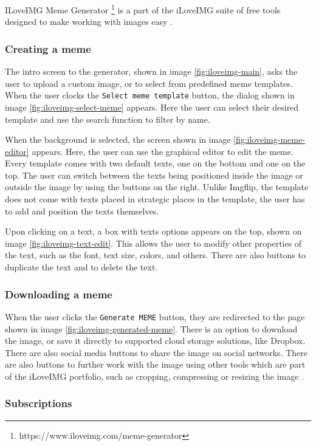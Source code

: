ILoveIMG Meme Generator \footnote{https://www.iloveimg.com/meme-generator} is a part of the iLoveIMG suite of free tools designed to make working with images easy \cite{iloveimg-features}.

\subsubsection{Creating a meme}

The intro screen to the generator, shown in image \ref{fig:iloveimg-main}, asks the user to upload a custom image, or to select from predefined meme templates. When the user clocks the \texttt{Select meme template} button, the dialog shown in image \ref{fig:iloveimg-select-meme} appears. Here the user can select their desired template and use the search function to filter by name.

When the background is selected, the screen shown in image \ref{fig:iloveimg-meme-editor} appears. Here, the user can use the graphical editor to edit the meme. Every template comes with two default texts, one on the bottom and one on the top. The user can switch between the texts being positioned inside the image or outside the image by using the buttons on the right. Unlike Imgflip, the template does not come with texts placed in strategic places in the template, the user has to add and position the texts themselves.

Upon clicking on a text, a box with texts options appears on the top, shown on image \ref{fig:iloveimg-text-edit}. This allows the user to modify other properties of the text, such as the font, text size, colors, and others. There are also buttons to duplicate the text and to delete the text.

\subsubsection{Downloading a meme}

When the user clicks the \texttt{Generate MEME} button, they are redirected to the page shown in image \ref{fig:iloveimg-generated-meme}. There is an option to download the image, or save it directly to supported cloud storage solutions, like Dropbox. There are also social media buttons to share the image on social networks. There are also buttons to further work with the image using other tools which are part of the iLoveIMG portfolio, such as cropping, compressing or resizing the image \cite{iloveimg-features}.

\subsubsection{Subscriptions}

